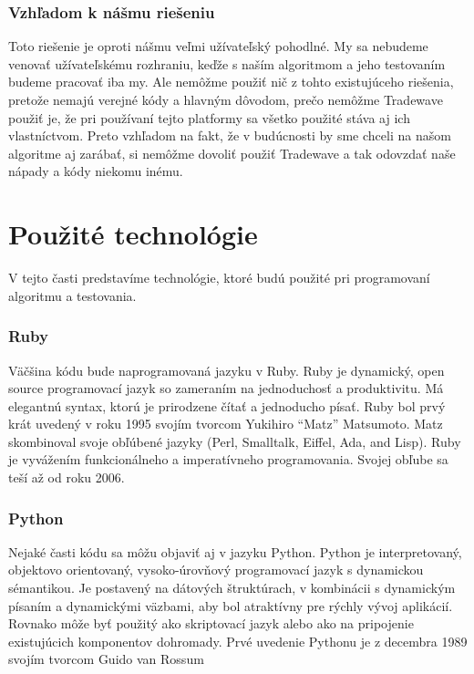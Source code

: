 \subsubsection{Vzhľadom k nášmu riešeniu} 
Toto riešenie je oproti nášmu veľmi užívateľský pohodlné. My sa nebudeme venovať užívateľskému rozhraniu, keďže s naším algoritmom a jeho testovaním budeme pracovať iba my. Ale nemôžme použiť nič z tohto existujúceho riešenia, pretože nemajú verejné kódy a hlavným dôvodom, prečo nemôžme Tradewave použiť je, že pri používaní tejto platformy sa všetko použité stáva aj ich vlastníctvom. Preto vzhľadom na fakt, že v budúcnosti by sme chceli na našom algoritme aj zarábať, si nemôžme dovoliť použiť Tradewave a tak odovzdať naše nápady a kódy niekomu inému. 
\section{Použité technológie} 
V tejto časti predstavíme technológie, ktoré budú použité pri programovaní algoritmu a testovania. 
\subsubsection{Ruby} 
Väčšina kódu bude naprogramovaná jazyku v Ruby. Ruby je dynamický, open source programovací jazyk so zameraním na jednoduchosť a produktivitu. Má elegantnú syntax, ktorú je prirodzene čítať a jednoducho písať. Ruby bol prvý krát uvedený v roku 1995 svojím tvorcom Yukihiro “Matz” Matsumoto. Matz skombinoval svoje obľúbené jazyky (Perl, Smalltalk, Eiffel, Ada, and Lisp). Ruby je vyvážením funkcionálneho a imperatívneho programovania. Svojej obľube sa teší až od roku 2006.\cite{Rb} 
\subsubsection{Python} 
Nejaké časti kódu sa môžu objaviť aj v jazyku Python. Python je interpretovaný, objektovo orientovaný, vysoko-úrovňový programovací jazyk s dynamickou sémantikou. Je postavený na dátových štruktúrach, v kombinácii s dynamickým písaním a dynamickými väzbami, aby bol atraktívny pre rýchly vývoj aplikácií. Rovnako môže byť použitý ako skriptovací jazyk alebo ako  na pripojenie existujúcich komponentov dohromady. Prvé uvedenie Pythonu je z decembra 1989 svojím tvorcom Guido van Rossum\cite{Pt} 
